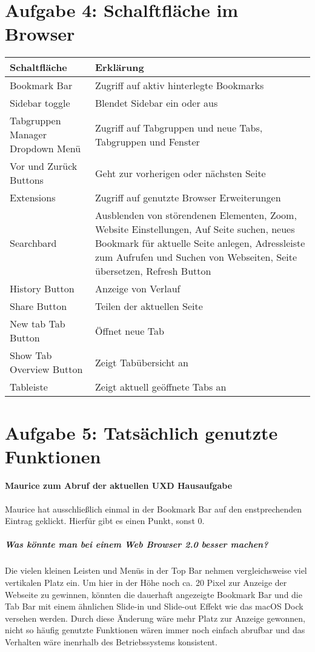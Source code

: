 \documentclass[a4paper,10pt]{article}
\begin{document}
    \section{Aufgabe 4: Schalftfläche im Browser}
    \begin{tabular}{|l|l|}
        \hline
        \textbf{Schaltfläche} & \textbf{Erklärung} \\
        \hline
        Bookmark Bar & Zugriff auf aktiv hinterlegte Bookmarks \\
        \hline
        Sidebar toggle & Blendet Sidebar ein oder aus \\
        \hline
        Tabgruppen Manager Dropdown Menü & Zugriff auf Tabgruppen und neue Tabs, Tabgruppen und Fenster \\
        \hline
        Vor und Zurück Buttons & Geht zur vorherigen oder nächsten Seite \\
        \hline
        Extensions & Zugriff auf genutzte Browser Erweiterungen \\
        \hline
        Searchbard & Ausblenden von störendenen Elementen, Zoom, Website Einstellungen, Auf Seite suchen, neues Bookmark für aktuelle Seite anlegen, Adressleiste zum Aufrufen und Suchen von Webseiten, Seite übersetzen, Refresh Button \\
        \hline
        History Button & Anzeige von Verlauf \\
        \hline
        Share Button & Teilen der aktuellen Seite \\
        \hline
        New tab Tab Button & Öffnet neue Tab \\
        \hline
        Show Tab Overview Button & Zeigt Tabübersicht an \\
        \hline
        Tableiste & Zeigt aktuell geöffnete Tabs an \\
    \end{tabular}

    \section{Aufgabe 5: Tatsächlich genutzte Funktionen}
    \paragraph{Maurice zum Abruf der aktuellen UXD Hausaufgabe}
    Maurice hat ausschließlich einmal in der Bookmark Bar auf den enstprechenden Eintrag geklickt.
    Hierfür gibt es einen Punkt, sonst 0.

    \subparagraph{Was könnte man bei einem Web Browser 2.0 besser machen?}
    Die vielen kleinen Leisten und Menüs in der Top Bar nehmen vergleichsweise viel vertikalen Platz ein.
    Um hier in der Höhe noch ca. 20 Pixel zur Anzeige der Webseite zu gewinnen, könnten die dauerhaft angezeigte Bookmark Bar und die Tab Bar mit einem ähnlichen Slide-in und Slide-out Effekt wie das macOS Dock versehen werden.
    Durch diese Änderung wäre mehr Platz zur Anzeige gewonnen, nicht so häufig genutzte Funktionen wären immer noch einfach abrufbar und das Verhalten wäre inenrhalb des Betriebssystems konsistent.
\end{document}
